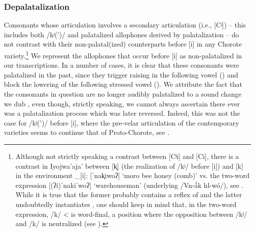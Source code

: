 \subsubsection{Depalatalization}\label{ch-depal}
Consonants whose articulation involves a secondary articulation (i.e., [Cʲ]) -- this includes both /kʲ(’)/ and palatalized allophones derived by palatalization -- do not contrast with their non-palatal(ized) counterparts before [i] in any Chorote variety.\footnote{Although not strictly speaking a contrast between [Cʲi] and [Ci], there is a contrast in Iyojwa'aja' between [k̟] (the realization of /kʲ/ before [i]) and [k] in the environment \mbox{\_[i]}: \mbox{[ˈnak̟iwoʔ]} `moro bee honey (comb)' vs. the two-word expression [(ʔi)ˈnakiˈwoʔ] \recind [(ʔi)ˈnaqiˈwoʔ] `warehouseman' (underlying /Vn\mbox{-}ǻk hl\mbox{-}wó/), see \citet[79, fn. 6]{JC14b}. While it is true that the former probably contains a reflex of  and the latter undoubtedly instantiates , one should keep in mind that, in the two-word expression, /k/ <  is word-final, a position where the opposition between /kʲ/ and /k/ is neutralized (see ).}
We represent the allophones that occur before [i] as non-palatalized in our transcriptions. In a number of cases, it is clear that these consonants were palatalized in the past, since they trigger raising in the following vowel () and block the lowering of the following stressed vowel (). We attribute the fact that the consonants in question are no longer audibly palatalized to a sound change we dub , even though, strictly speaking, we cannot always ascertain there ever was a palatalization process which was later reversed. Indeed, this was not the case for /kʲ(’)/ before [i], where the pre-velar articulation of the contemporary varieties seems to continue that of Proto-Chorote, see .

\begin{exe}
    \ex {}
    \ex {}
    \ex {}
    \ex {}
\end{exe}


